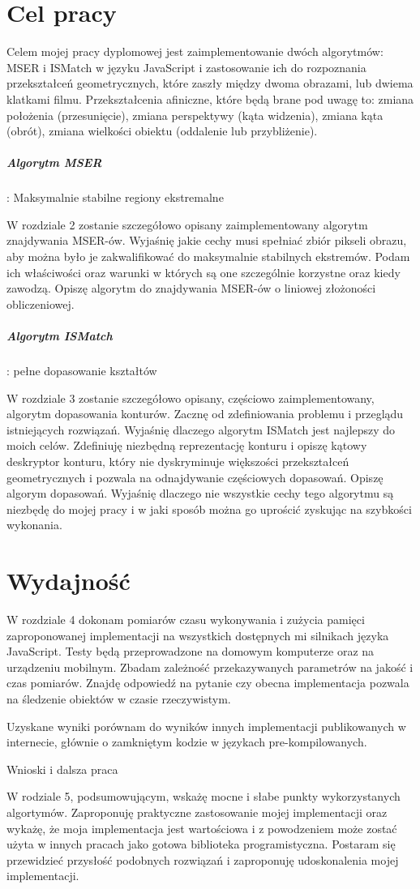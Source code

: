 \section{Cel pracy}

Celem mojej pracy dyplomowej jest zaimplementowanie dwóch algorytmów: MSER i
ISMatch w języku JavaScript i zastosowanie ich do rozpoznania przekształceń
geometrycznych, które zaszły między dwoma obrazami, lub dwiema klatkami filmu.
Przekształcenia afiniczne, które będą brane pod uwagę to: zmiana położenia
(przesunięcie), zmiana perspektywy (kąta widzenia), zmiana kąta (obrót), zmiana
wielkości obiektu (oddalenie lub przybliżenie).

\subparagraph{Algorytm MSER}: Maksymalnie stabilne regiony ekstremalne

W rozdziale 2 zostanie szczegółowo opisany zaimplementowany algorytm
znajdywania MSER-ów. Wyjaśnię jakie cechy musi spełniać zbiór pikseli obrazu,
aby można było je zakwalifikować do maksymalnie stabilnych ekstremów.  Podam
ich właściwości oraz warunki w których są one szczególnie korzystne oraz kiedy
zawodzą. Opiszę algorytm do znajdywania MSER-ów o liniowej złożoności
obliczeniowej.

\subparagraph{Algorytm ISMatch}: pełne dopasowanie kształtów

W rozdziale 3 zostanie szczegółowo opisany, częściowo zaimplementowany,
algorytm dopasowania konturów. Zacznę od zdefiniowania problemu i przeglądu
istniejących rozwiązań. Wyjaśnię dlaczego algorytm ISMatch jest najlepszy do
moich celów. Zdefiniuję niezbędną reprezentację konturu i opiszę kątowy
deskryptor konturu, który nie dyskryminuje większości przekształceń
geometrycznych i pozwala na odnajdywanie częściowych dopasowań. Opiszę algorym
dopasowań.  Wyjaśnię dlaczego nie wszystkie cechy tego algorytmu są niezbędę do
mojej pracy i w jaki sposób można go uprościć zyskując na szybkości wykonania.

\section{Wydajność}

W rozdziale 4 dokonam pomiarów czasu wykonywania i zużycia pamięci
zaproponowanej implementacji na wszystkich dostępnych mi silnikach języka
JavaScript. Testy będą przeprowadzone na domowym komputerze oraz na urządzeniu
mobilnym.  Zbadam zależność przekazywanych parametrów na jakość i czas
pomiarów. Znajdę odpowiedź na pytanie czy obecna implementacja pozwala na
śledzenie obiektów w czasie rzeczywistym.

Uzyskane wyniki porównam do wyników innych implementacji publikowanych w
internecie, głównie o zamkniętym kodzie w językach pre-kompilowanych.

Wnioski i dalsza praca

W rodziale 5, podsumowującym, wskażę mocne i słabe punkty wykorzystanych
algortymów. Zaproponuję praktyczne zastosowanie mojej implementacji oraz
wykażę, że moja implementacja jest wartościowa i z powodzeniem może zostać
użyta w innych pracach jako gotowa biblioteka programistyczna. Postaram się
przewidzieć przysłość podobnych rozwiązań i zaproponuję udoskonalenia mojej
implementacji.
